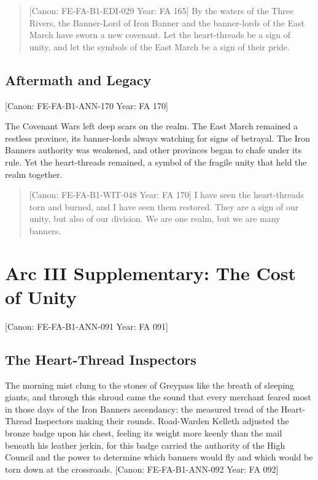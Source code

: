 \begin{quote}
{[}Canon: FE-FA-B1-EDI-029 \textbar{} Year: FA 165{]} By the waters of
the Three Rivers, the Banner-Lord of Iron Banner and the banner-lords of
the East March have sworn a new covenant. Let the heart-threads be a
sign of unity, and let the symbols of the East March be a sign of their
pride.
\end{quote}

\subsection{Aftermath and Legacy}\label{aftermath-and-legacy}

{[}Canon: FE-FA-B1-ANN-170 \textbar{} Year: FA 170{]}

The Covenant Wars left deep scars on the realm. The East March remained
a restless province, its banner-lords always watching for signs of
betrayal. The Iron Banner\textquotesingle s authority was weakened, and
other provinces began to chafe under its rule. Yet the heart-threads
remained, a symbol of the fragile unity that held the realm together.

\begin{quote}
{[}Canon: FE-FA-B1-WIT-048 \textbar{} Year: FA 170{]} I have seen the
heart-threads torn and burned, and I have seen them restored. They are a
sign of our unity, but also of our division. We are one realm, but we
are many banners.
\end{quote}

\section{Arc III Supplementary: The Cost of
Unity}\label{arc-iii-supplementary-the-cost-of-unity}

{[}Canon: FE-FA-B1-ANN-091 \textbar{} Year: FA 091{]}

\subsection{The Heart-Thread
Inspectors}\label{the-heart-thread-inspectors}

The morning mist clung to the stones of Greypass like the breath of
sleeping giants, and through this shroud came the sound that every
merchant feared most in those days of the Iron Banner\textquotesingle s
ascendancy: the measured tread of the Heart-Thread Inspectors making
their rounds. Road-Warden Kelleth adjusted the bronze badge upon his
chest, feeling its weight more keenly than the mail beneath his leather
jerkin, for this badge carried the authority of the High Council and the
power to determine which banners would fly and which would be torn down
at the crossroads. {[}Canon: FE-FA-B1-ANN-092 \textbar{} Year: FA 092{]}


